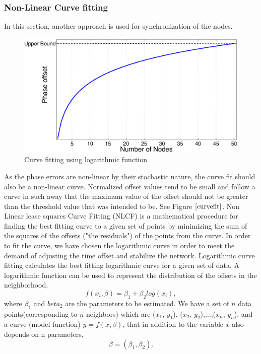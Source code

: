 \documentclass[a4paper,10pt]{report}
\begin{document}
\subsubsection{Non-Linear Curve fitting}
In this section, another approach is used for synchronization
of the nodes.
\newline
\begin{figure}
\centering
\includegraphics[width=0.75 \textwidth]{curvefit}
\caption{Curve fitting using logarithmic function} \label{curvefit}
\end{figure}
As the phase errors are non-linear by their stochastic nature, the curve fit
should also be a non-linear curve. Normalized offset values tend to
be small and follow a curve in such away that the maximum value of
the offset should not be greater than the threshold value that was
intended to be. See Figure $\ref{curvefit}$. \newline Non Linear
lease squares Curve Fitting (NLCF) is a mathematical procedure for
finding the best fitting curve to a given set of points by
minimizing the sum of the squares of the offsets ("the residuals")
of the points from the curve. In order to fit the curve, we have
chosen the logarithmic curve in order to meet the demand of
adjusting the time offset and stabilize the network. Logarithmic
curve fitting calculates the best fitting logarithmic curve for a
given set of data. A logarithmic function can be used to represent
the distribution of the offsets in the neighborhood,
\begin{equation}
 f(x_i,\beta)= \beta _1 + \beta_2log(x_i),
\end{equation}
where $\beta_1$ and $beta_2$ are the parameters to be estimated.\newline
We have a set of $n$ data points(corresponding to $n$ neighbors) which are ($x_1$, $y_1$),
($x_2$, $y_2$),$\dots$,($x_n$, $y_n$), and a curve (model function)
$y= f(x, \beta)$, that in addition to the variable $x$ also depends on
n parameters,
\begin{equation}
\beta = (\beta_1, \beta_2).
\end{equation}
\end{document}
